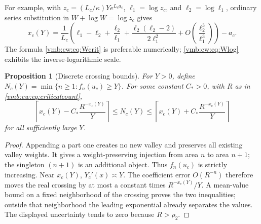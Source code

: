 \documentclass[11pt,a4paper]{article}
\numberwithin{equation}{section}
\newtheorem{proposition}[theorem]{Proposition}
\theoremstyle{definition}\newtheorem{definition}[theorem]{Definition}
\theoremstyle{remark}\newtheorem{remark}[theorem]{Remark}
\begin{document}
For example, with $z_c=(L_c/\kappa)Ye^{L_ca_c}$, $\ell_1=\log z_c$, and
$\ell_2=\log \ell_1$, ordinary series substitution in $W+\log W=\log z_c$ gives
\begin{equation}\label{vmb:cw:eq:Wlog}
 x_c(Y)=\frac1{L_c}\left(
 \ell_1-\ell_2+\frac{\ell_2}{\ell_1}
 +\frac{\ell_2(\ell_2-2)}{2\ell_1^2}
 +O\left(\frac{\ell_2^3}{\ell_1^3}\right)\right)-a_c.
\end{equation}
The formula \eqref{vmb:cw:eq:Wcrit} is preferable numerically; \eqref{vmb:cw:eq:Wlog}
exhibits the inverse-logarithmic scale.

\begin{proposition}[Discrete crossing bounds]\label{vmb:cw:prop:rounding}
For $Y>0$, define $N_c(Y)=\min\{n\ge1:f_n(u_c)\ge Y\}$. For some
constant $C_*>0$, with $R$ as in \eqref{vmb:cw:eq:criticalcount},
\begin{equation}\label{vmb:cw:eq:rounding}
 \left\lceil x_c(Y)-C_*\frac{R^{-x_c(Y)}}Y\right\rceil
 \le N_c(Y)\le
 \left\lceil x_c(Y)+C_*\frac{R^{-x_c(Y)}}Y\right\rceil
\end{equation}
for all sufficiently large $Y$.
\end{proposition}
\begin{proof}
Appending a part one creates no new valley and preserves all existing
valley weights. It gives a weight-preserving injection from area $n$ to
area $n+1$; the singleton $(n+1)$ is an additional object. Thus $f_n(u_c)$
is strictly increasing. Near $x_c(Y)$, $Y_c'(x)\asymp Y$. The coefficient
error $O(R^{-n})$ therefore moves the real crossing by at most a constant
times $R^{-x_c(Y)}/Y$. A mean-value bound on a fixed neighborhood of the
crossing proves the two inequalities; outside that neighborhood the leading
exponential already separates the values. The displayed uncertainty tends
to zero because $R>\rho_2$.
\end{proof}
\end{document}
